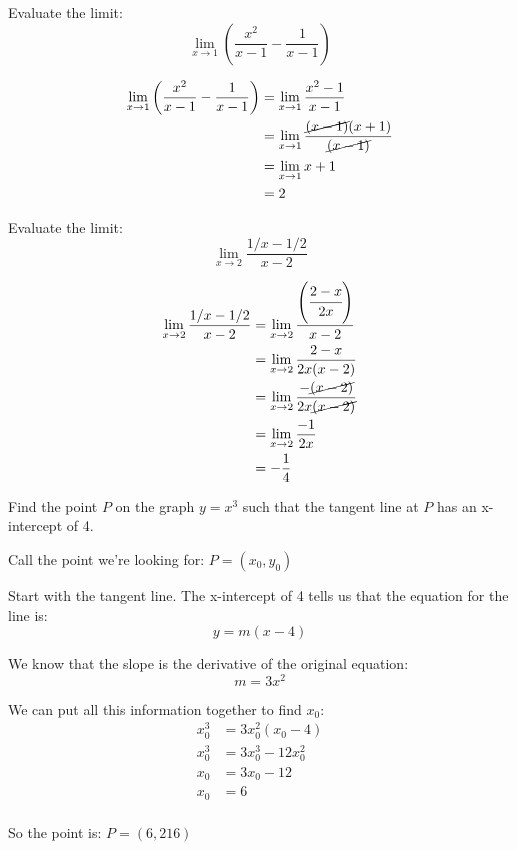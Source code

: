 \documentclass[fleqn]{exam}
\begin{document}
\begin{questions}


\question
Evaluate the limit:
\[
  \lim_{x \to 1} \left( \frac{x^2}{x-1} - \frac{1}{x-1} \right)
\]

\begin{solution}
\begin{align*}
  \lim_{x \to 1} \left( \frac{x^2}{x-1} - \frac{1}{x-1} \right) &= \lim_{x \to 1} \frac{x^2 - 1}{x-1} \\
  &= \lim_{x \to 1} \frac{\cancel{(x - 1)}(x+1)}{\cancel{(x-1)}} \\
  &= \lim_{x \to 1} x+1 \\
  &= 2 \\
\end{align*}
\end{solution}

\question
Evaluate the limit:
\[
  \lim_{x \to 2} \frac{1/x - 1/2}{x - 2}
\]

\begin{solution}
\begin{align*}
  \lim_{x \to 2} \frac{1/x - 1/2}{x - 2} &=  \lim_{x \to 2} \frac{ \left( \cfrac{2 - x}{2x} \right) }{x - 2} \\
   &=  \lim_{x \to 2} \frac{2 - x}{2x(x - 2)} \\
   &=  \lim_{x \to 2} \frac{- \cancel{(x - 2)}}{2x \cancel{(x - 2)}} \\
   &=  \lim_{x \to 2} \frac{-1}{2x} \\
   &=  - \frac{1}{4} \\
\end{align*}
\end{solution}

\question
Find the point $P$ on the graph $y = x^3$ such that the tangent line at $P$ has an x-intercept of 4.

\begin{solution}
Call the point we're looking for: $P = (x_0, y_0)$

Start with the tangent line.  The x-intercept of 4 tells us that the equation for the line is:
\[
  y = m(x-4)
\]

We know that the slope is the derivative of the original equation:
\[
  m = 3x^2
\]

We can put all this information together to find $x_0$:
\begin{align*}
  x_0^3 &= 3x_0^2(x_0 - 4) \\
  x_0^3 &= 3x_0^3 - 12x_0^2 \\
  x_0 &= 3x_0 - 12 \\
  x_0 &= 6 \\
\end{align*}

So the point is: $P = (6, 216)$

\end{solution}

\end{questions}
\end{document}
